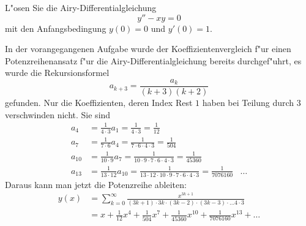 L"osen Sie die Airy-Differentialgleichung
\[
y''-xy=0
\]
mit den Anfangsbedingung $y(0)=0$ und $y'(0)=1$.

\begin{loesung}
In der vorangegangenen Aufgabe wurde der Koeffizientenvergleich f"ur einen
Potenzreihenansatz f"ur die Airy-Differentialgleichung bereits durchgef"uhrt,
es wurde die Rekursionsformel
\[
a_{k+3}=\frac{a_k}{(k+3)(k+2)}
\]
gefunden.
Nur die Koeffizienten, deren Index Rest $1$ haben bei Teilung durch $3$
verschwinden nicht.
Sie sind
\begin{align*}
a_4&=\frac1{4\cdot 3}a_1=\frac1{4\cdot 3}=\frac1{12}
\\
a_7&=\frac1{7\cdot 6}a_4=\frac1{7\cdot 6\cdot 4\cdot 3}=\frac1{504}
\\
a_{10}&=\frac1{10\cdot 9}a_7
=
\frac1{10\cdot 9\cdot 7\cdot 6\cdot 4\cdot 3}=\frac1{45360}
\\
a_{13}&=\frac1{13\cdot 12}a_{10}=
\frac1{13\cdot 12\cdot 10\cdot 9\cdot 7\cdot 6\cdot 4\cdot 3}=\frac1{7076160}
&\dots
\end{align*}
Daraus kann man jetzt die Potenzreihe ableiten:
\begin{align*}
y(x)
&=
\sum_{k=0}^\infty \frac{x^{3k+1}}{(3k+1)\cdot3k\cdot (3k-2)\cdot(3k-3)\cdot \dots 4\cdot 3}
\\
&=
x + \frac1{12}x^4+\frac1{504}x^7+\frac1{45360}x^{10}+\frac1{7076160}x^{13}+\dots
\end{align*}
\end{loesung}

